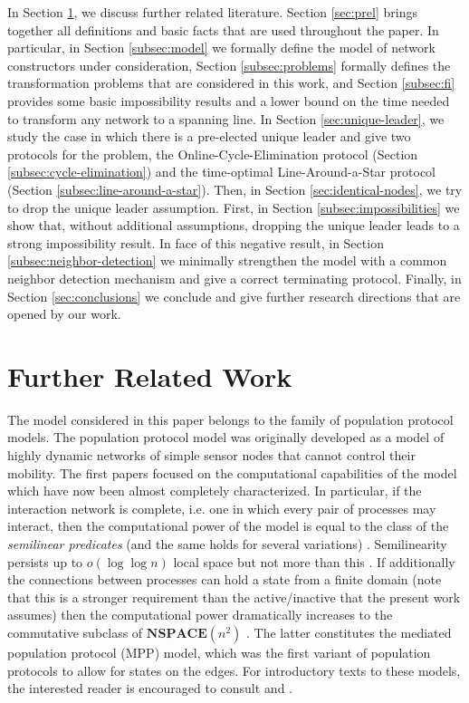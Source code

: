 \documentclass[preprint]{elsarticle}
\newcommand{\rem}{\mathbf}
\begin{document}
In Section \ref{sec:rw}, we discuss further related literature. Section \ref{sec:prel} brings together all definitions and basic facts that are used throughout the paper. In particular, in Section \ref{subsec:model} we formally define the model of network constructors under consideration, Section \ref{subsec:problems} formally defines the transformation problems that are considered in this work, and Section \ref{subsec:fi} provides some basic impossibility results and a lower bound on the time needed to transform any network to a spanning line. In Section \ref{sec:unique-leader}, we study the case in which there is a pre-elected unique leader and give two protocols for the problem, the Online-Cycle-Elimination protocol (Section \ref{subsec:cycle-elimination}) and the time-optimal Line-Around-a-Star protocol (Section \ref{subsec:line-around-a-star}). Then, in Section \ref{sec:identical-nodes}, we try to drop the unique leader assumption. First, in Section \ref{subsec:impossibilities} we show that, without additional assumptions, dropping the unique leader leads to a strong impossibility result. In face of this negative result, in Section \ref{subsec:neighbor-detection} we minimally strengthen the model with a common neighbor detection mechanism and give a correct terminating protocol. Finally, in Section \ref{sec:conclusions} we conclude and give further research directions that are opened by our work.  

\section{Further Related Work}
\label{sec:rw}

The model considered in this paper belongs to the family of population protocol models. The population protocol model \cite{AADFP06} was originally developed as a model of highly dynamic networks of simple sensor nodes that cannot control their mobility. The first papers focused on the computational capabilities of the model which have now been almost completely characterized. In particular, if the interaction network is complete, i.e. one in which every pair of processes may interact, then the computational power of the model is equal to the class of the \emph{semilinear predicates} (and the same holds for several variations) \cite{AAER07}. Semilinearity persists up to $o(\log\log n)$ local space but not more than this \cite{MNPS11}. If additionally the connections between processes can hold a state from a finite domain (note that this is a stronger requirement than the active/inactive that the present work assumes) then the computational power dramatically increases to the commutative subclass of $\rem{NSPACE}(n^2)$ \cite{MCS11-2}. The latter constitutes the mediated population protocol (MPP) model, which was the first variant of population protocols to allow for states on the edges. For introductory texts to these models, the interested reader is encouraged to consult \cite{AR09} and \cite{MCS11}. 
\end{document}
